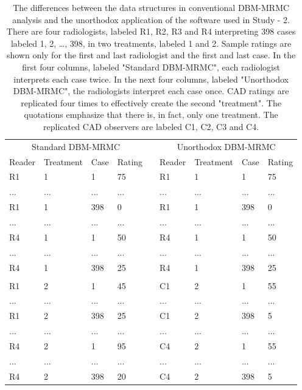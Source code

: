 \documentclass[
]{book}
\begin{document}
\begin{table}

\caption{\label{tab:standalone-cad-table-conventional}The differences between the data structures in conventional DBM-MRMC analysis and the unorthodox application of the software used in Study - 2. There are four radiologists, labeled R1, R2, R3 and R4 interpreting 398 cases labeled 1, 2, …, 398, in two treatments, labeled 1 and 2. Sample ratings are shown only for the first and last radiologist and the first and last case. In the first four columns, labeled "Standard DBM-MRMC", each radiologist interprets each case twice. In the next four columns, labeled "Unorthodox DBM-MRMC", the radiologists interpret each case once. CAD ratings are replicated four times to effectively create the second "treatment". The quotations emphasize that there is, in fact, only one treatment. The replicated CAD observers are labeled C1, C2, C3 and C4.}
\centering
\begin{tabular}[t]{lllllllll}
\toprule
\multicolumn{4}{c}{Standard DBM-MRMC} & \multicolumn{1}{c}{} & \multicolumn{4}{c}{Unorthodox DBM-MRMC} \\
\cmidrule(l{3pt}r{3pt}){1-4} \cmidrule(l{3pt}r{3pt}){6-9}
Reader & Treatment & Case & Rating &  & Reader & Treatment & Case & Rating\\
\midrule
R1 & 1 & 1 & 75 &  & R1 & 1 & 1 & 75\\
... & ... & ... & ... &  & ... & ... & ... & ...\\
R1 & 1 & 398 & 0 &  & R1 & 1 & 398 & 0\\
... & ... & ... & ... &  & ... & ... & ... & ...\\
R4 & 1 & 1 & 50 &  & R4 & 1 & 1 & 50\\
\addlinespace
... & ... & ... & ... &  & ... & ... & ... & ...\\
R4 & 1 & 398 & 25 &  & R4 & 1 & 398 & 25\\
 &  &  &  &  &  &  &  & \\
R1 & 2 & 1 & 45 &  & C1 & 2 & 1 & 55\\
... & ... & ... & ... &  & ... & ... & ... & ...\\
\addlinespace
R1 & 2 & 398 & 25 &  & C1 & 2 & 398 & 5\\
... & ... & ... & ... &  & ... & ... & ... & ...\\
R4 & 2 & 1 & 95 &  & C4 & 2 & 1 & 55\\
... & ... & ... & ... &  & ... & ... & ... & ...\\
R4 & 2 & 398 & 20 &  & C4 & 2 & 398 & 5\\
\bottomrule
\end{tabular}
\end{table}
\end{document}
